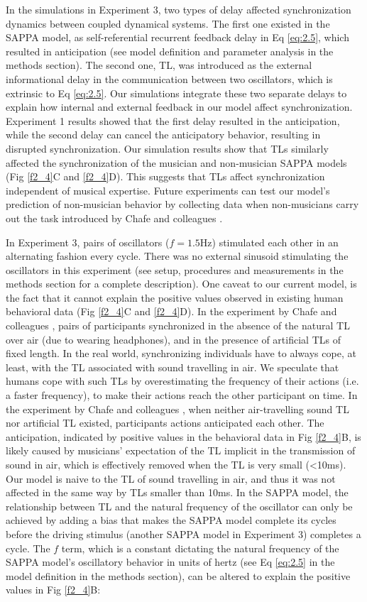 \documentclass{report}
\begin{document}
In the simulations in Experiment 3, two types of delay affected synchronization dynamics between coupled dynamical systems. The first one existed in the SAPPA model, as self-referential recurrent feedback delay in Eq \eqref{eq:2.5}, which resulted in anticipation (see model definition and parameter analysis in the methods section). The second one, TL, was introduced as the external informational delay in the communication between two oscillators, which is extrinsic to Eq \eqref{eq:2.5}. Our simulations integrate these two separate delays to explain how internal and external feedback in our model affect synchronization. Experiment 1 results showed that the first delay resulted in the anticipation, while the second delay can cancel the anticipatory behavior, resulting in disrupted synchronization. Our simulation results show that TLs similarly affected the synchronization of the musician and non-musician SAPPA models (Fig \ref{f2_4}C and \ref{f2_4}D). This suggests that TLs affect synchronization independent of musical expertise. Future experiments can test our model’s prediction of non-musician behavior by collecting data when non-musicians carry out the task introduced by Chafe and colleagues \cite{chafe2010effect}.

In Experiment 3, pairs of oscillators ($f = 1.5$Hz) stimulated each other in an alternating fashion every cycle. There was no external sinusoid stimulating the oscillators in this experiment (see setup, procedures and measurements in the methods section for a complete description). One caveat to our current model, is the fact that it cannot explain the positive values observed in existing human behavioral data (Fig \ref{f2_4}C and \ref{f2_4}D). In the experiment by Chafe and colleagues \cite{chafe2010effect}, pairs of participants synchronized in the absence of the natural TL over air (due to wearing headphones), and in the presence of artificial TLs of fixed length. In the real world, synchronizing individuals have to always cope, at least, with the TL associated with sound travelling in air. We speculate that humans cope with such TLs by overestimating the frequency of their actions (i.e. a faster frequency), to make their actions reach the other participant on time. In the experiment by Chafe and colleagues \cite{chafe2010effect}, when neither air-travelling sound TL nor artificial TL existed, participants actions anticipated each other. The anticipation, indicated by positive values in the behavioral data in Fig \ref{f2_4}B, is likely caused by musicians’ expectation of the TL implicit in the transmission of sound in air, which is effectively removed when the TL is very small (<10ms). Our model is naive to the TL of sound travelling in air, and thus it was not affected in the same way by TLs smaller than 10ms. In the SAPPA model, the relationship between TL and the natural frequency of the oscillator can only be achieved by adding a bias that makes the SAPPA model complete its cycles before the driving stimulus (another SAPPA model in Experiment 3) completes a cycle. The $f$ term, which is a constant dictating the natural frequency of the SAPPA model’s oscillatory behavior in units of hertz (see Eq \eqref{eq:2.5} in the model definition in the methods section), can be altered to explain the positive values in Fig \ref{f2_4}B:  
\end{document}
